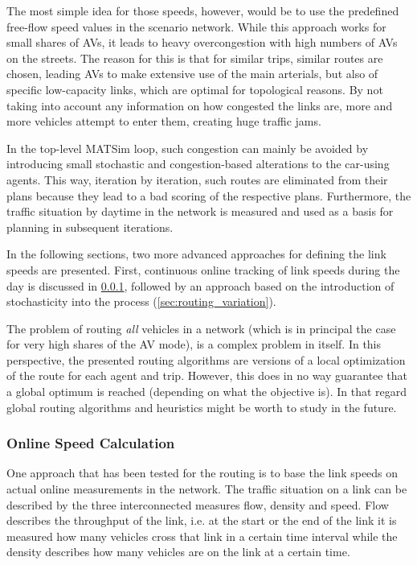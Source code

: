 The most simple idea for those speeds, however, would be to use the predefined free-flow speed values in
the scenario network. While this approach works for small shares of AVs, it leads
to heavy overcongestion with high numbers of AVs on the streets. The reason
for this is that for similar trips, similar routes are chosen, leading AVs to make
extensive use of the main arterials, but also of specific low-capacity links, which
are optimal for topological reasons. By not taking into account any information
on how congested the links are, more and more vehicles attempt to enter
them, creating huge traffic jams.

In the top-level MATSim loop, such congestion can mainly be  avoided by introducing
small stochastic and congestion-based alterations to the car-using agents. This way,
iteration by iteration, such routes are eliminated from their plans because they
lead to a bad scoring of the respective plans. Furthermore, the traffic situation
by daytime in the network is measured and used as a basis for planning in subsequent
iterations.

In the following sections, two more advanced approaches for defining the link speeds
are presented. First, continuous online tracking of link speeds during the day is
discussed in \cref{sec:routing_online}, followed by an approach based on the
introduction of stochasticity into the process (\cref{sec:routing_variation}).

The problem of routing \textit{all} vehicles in a network (which is
in principal the case for very high shares of the AV mode), is a complex problem
in itself. In this perspective, the presented routing algorithms are versions of
a local optimization of the route for each agent and trip. However, this does in
no way guarantee that a global optimum is reached (depending on what the objective
is). In that regard global routing algorithms and heuristics might be worth to study in the future.

\subsubsection{Online Speed Calculation}
\label{sec:routing_online}

One approach that has been tested for the routing is to base the link speeds on
actual online measurements in the network. The traffic situation on
a link can be described by the three interconnected measures flow,
density and speed. Flow describes the throughput of the link, i.e. at the start
or the end of the link it is measured how many vehicles cross that link in a
certain time interval while the density describes how many vehicles are on
the link at a certain time.

